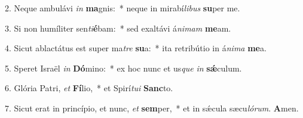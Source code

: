 2. Neque ambulávi \textit{in} \textbf{ma}gnis:~*  neque in mirabí\textit{li}\textit{bus} \textbf{su}per me.\

3. Si non humíliter sen\textit{ti}\textbf{é}bam:~*  sed exaltávi á\textit{ni}\textit{mam} \textbf{me}am.\

4. Sicut ablactátus est super ma\textit{tre} \textbf{su}a:~*  ita retribútio in á\textit{ni}\textit{ma} \textbf{me}a.\

5. Speret Israël \textit{in} \textbf{Dó}mino:~*  ex hoc nunc et us\textit{que} \textit{in} \textbf{sǽ}culum.\

6. Glória Patri, \textit{et} \textbf{Fí}lio,~*  et Spirí\textit{tu}\textit{i} \textbf{Sanc}to.\

7. Sicut erat in princípio, et nunc, \textit{et} \textbf{sem}per,~*  et in sǽcula sæcu\textit{ló}\textit{rum}. \textbf{A}men.\

